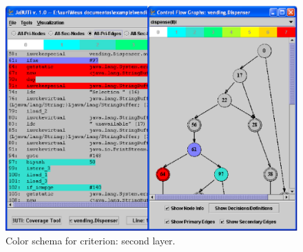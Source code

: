 \begin{figure}[!ht]
\begin{center}
\includegraphics[height=0.40\textheight]{fig/decision-layer2}
\caption{\label{fig:decision-color2} Color schema for
 criterion: second layer.}
\end{center}
\end{figure}
